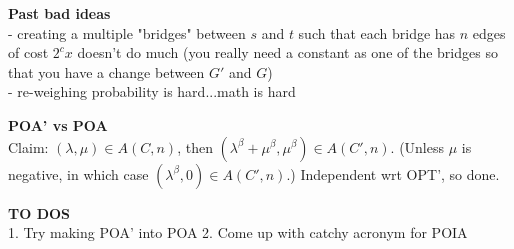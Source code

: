 \documentclass[11pt]{article}
\begin{document}
\textbf{Past bad ideas} \\
- creating a multiple "bridges" between $s$ and $t$ such that each bridge has
$n$ edges of cost $2^cx$ doesn't do much (you really need a constant as one of
the bridges so that you have a change between $G'$ and $G$) \\
- re-weighing probability is hard...math is hard

\textbf{POA' vs POA} \\
Claim: $(\lambda,\mu) \in A(C,n)$, then $(\lambda^\beta + \mu^\beta, \mu^\beta)
\in A(C',n)$. (Unless $\mu$ is negative, in which case $(\lambda^\beta, 0) \in
A(C',n)$.) Independent wrt OPT', so done. \cite{Roughgarden2012}

\textbf{TO DOS} \\
1. Try making POA' into POA
2. Come up with catchy acronym for POIA

\nocite{Awerbuch2005}
\nocite{Christodoulou2005}
\nocite{Rieger2008}

\printbibliography
\end{document}
